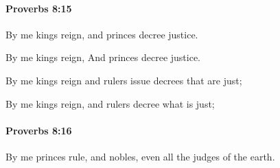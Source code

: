 		\paragraph{Proverbs 8:15} %
			\label{PROVERBS-8-15}

			By me kings reign, and princes decree justice.

			\begin{versebox}
					\item[BHS] 
					\item[ASV] By me kings reign, And princes decree justice.
					\item[NIV] By me kings reign and rulers issue decrees that are just;
					\item[NRSV] By me kings reign, and rulers decree what is just;
			\end{versebox}

		\paragraph{Proverbs 8:16} %
			\label{PROVERBS-8-16}

			By me princes rule, and nobles, even all the judges of the earth.

